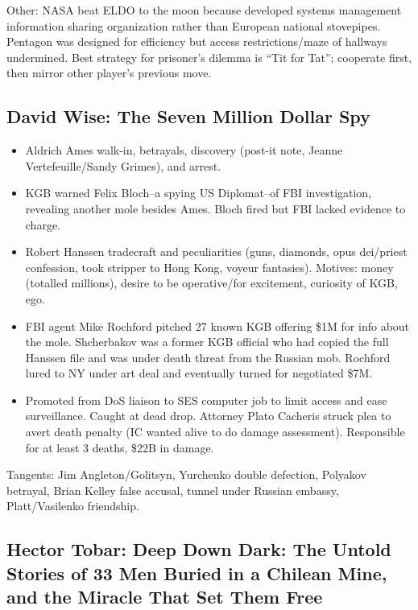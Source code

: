\documentclass[
]{article}
\begin{document}
Other: NASA beat ELDO to the moon because developed systems management
information sharing organization rather than European national
stovepipes. Pentagon was designed for efficiency but access
restrictions/maze of hallways undermined. Best strategy for prisoner's
dilemma is ``Tit for Tat''; cooperate first, then mirror other player's
previous move.

\hypertarget{david-wise-the-seven-million-dollar-spy}{%
\subsection{David Wise: The Seven Million Dollar
Spy}\label{david-wise-the-seven-million-dollar-spy}}

\begin{itemize}
\item
  Aldrich Ames walk-in, betrayals, discovery (post-it note, Jeanne
  Vertefeuille/Sandy Grimes), and arrest.
\item
  KGB warned Felix Bloch--a spying US Diplomat--of FBI investigation,
  revealing another mole besides Ames. Bloch fired but FBI lacked
  evidence to charge.
\item
  Robert Hanssen tradecraft and peculiarities (guns, diamonds, opus
  dei/priest confession, took stripper to Hong Kong, voyeur fantasies).
  Motives: money (totalled millions), desire to be operative/for
  excitement, curiosity of KGB, ego.
\item
  FBI agent Mike Rochford pitched 27 known KGB offering \$1M for info
  about the mole. Shcherbakov was a former KGB official who had copied
  the full Hanssen file and was under death threat from the Russian mob.
  Rochford lured to NY under art deal and eventually turned for
  negotiated \$7M.
\item
  Promoted from DoS liaison to SES computer job to limit access and ease
  surveillance. Caught at dead drop. Attorney Plato Cacheris struck plea
  to avert death penalty (IC wanted alive to do damage assessment).
  Responsible for at least 3 deaths, \$22B in damage.
\end{itemize}

Tangents: Jim Angleton/Golitsyn, Yurchenko double defection, Polyakov
betrayal, Brian Kelley false accusal, tunnel under Russian embassy,
Platt/Vasilenko friendship.

\hypertarget{hector-tobar-deep-down-dark-the-untold-stories-of-33-men-buried-in-a-chilean-mine-and-the-miracle-that-set-them-free}{%
\subsection{Hector Tobar: Deep Down Dark: The Untold Stories of 33 Men
Buried in a Chilean Mine, and the Miracle That Set Them
Free}\label{hector-tobar-deep-down-dark-the-untold-stories-of-33-men-buried-in-a-chilean-mine-and-the-miracle-that-set-them-free}}
\end{document}
